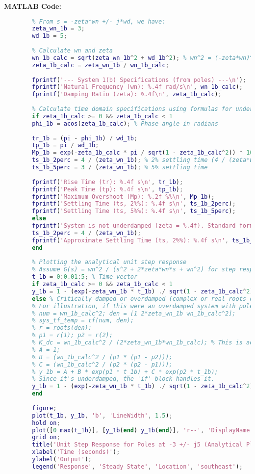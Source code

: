 \documentclass{article}
\begin{document}
	\textbf{MATLAB Code:}
	\begin{lstlisting}[language=Matlab, caption=MATLAB Code for Problem 1(b) (Using Formulas)]
		% Given pole: S = -3 - j5. Implies conjugate pair: -3 +/- j5.
		% From s = -zeta*wn +/- j*wd, we have:
		zeta_wn_1b = 3;
		wd_1b = 5;
		
		% Calculate wn and zeta
		wn_1b_calc = sqrt(zeta_wn_1b^2 + wd_1b^2); % wn^2 = (-zeta*wn)^2 + wd^2
		zeta_1b_calc = zeta_wn_1b / wn_1b_calc;
		
		fprintf('--- System 1(b) Specifications (from poles) ---\n');
		fprintf('Natural Frequency (wn): %.4f rad/s\n', wn_1b_calc);
		fprintf('Damping Ratio (zeta): %.4f\n', zeta_1b_calc);
		
		% Calculate time domain specifications using formulas for underdamped system
		if zeta_1b_calc >= 0 && zeta_1b_calc < 1
		phi_1b = acos(zeta_1b_calc); % Phase angle in radians
		
		tr_1b = (pi - phi_1b) / wd_1b;
		tp_1b = pi / wd_1b;
		Mp_1b = exp(-zeta_1b_calc * pi / sqrt(1 - zeta_1b_calc^2)) * 100;
		ts_1b_2perc = 4 / (zeta_wn_1b); % 2% settling time (4 / (zeta*wn))
		ts_1b_5perc = 3 / (zeta_wn_1b); % 5% settling time
		
		fprintf('Rise Time (tr): %.4f s\n', tr_1b);
		fprintf('Peak Time (tp): %.4f s\n', tp_1b);
		fprintf('Maximum Overshoot (Mp): %.2f %%\n', Mp_1b);
		fprintf('Settling Time (ts, 2%%): %.4f s\n', ts_1b_2perc);
		fprintf('Settling Time (ts, 5%%): %.4f s\n', ts_1b_5perc);
		else
		fprintf('System is not underdamped (zeta = %.4f). Standard formulas for tp, Mp not applicable.\n', zeta_1b_calc);
		ts_1b_2perc = 4 / (zeta_wn_1b);
		fprintf('Approximate Settling Time (ts, 2%%): %.4f s\n', ts_1b_2perc);
		end
		
		% Plotting the analytical unit step response
		% Assume G(s) = wn^2 / (s^2 + 2*zeta*wn*s + wn^2) for step response
		t_1b = 0:0.01:5; % Time vector
		if zeta_1b_calc >= 0 && zeta_1b_calc < 1
		y_1b = 1 - (exp(-zeta_wn_1b * t_1b) ./ sqrt(1 - zeta_1b_calc^2)) .* sin(wd_1b * t_1b + phi_1b);
		else % Critically damped or overdamped (complex or real roots of the denominator)
		% For illustration, if this were an overdamped system with poles p1, p2:
		% num = wn_1b_calc^2; den = [1 2*zeta_wn_1b wn_1b_calc^2];
		% sys_tf_temp = tf(num, den);
		% r = roots(den);
		% p1 = r(1); p2 = r(2);
		% K_dc = wn_1b_calc^2 / (2*zeta_wn_1b*wn_1b_calc); % This is actually 1.
		% A = 1;
		% B = (wn_1b_calc^2 / (p1 * (p1 - p2)));
		% C = (wn_1b_calc^2 / (p2 * (p2 - p1)));
		% y_1b = A + B * exp(p1 * t_1b) + C * exp(p2 * t_1b);
		% Since it's underdamped, the 'if' block handles it.
		y_1b = 1 - (exp(-zeta_wn_1b * t_1b) ./ sqrt(1 - zeta_1b_calc^2)) .* sin(wd_1b * t_1b + phi_1b);
		end
		
		figure;
		plot(t_1b, y_1b, 'b', 'LineWidth', 1.5);
		hold on;
		plot([0 max(t_1b)], [y_1b(end) y_1b(end)], 'r--', 'DisplayName', 'Steady State');
		grid on;
		title('Unit Step Response for Poles at -3 +/- j5 (Analytical Plot)');
		xlabel('Time (seconds)');
		ylabel('Output');
		legend('Response', 'Steady State', 'Location', 'southeast');
	\end{lstlisting}
	
\end{document}
